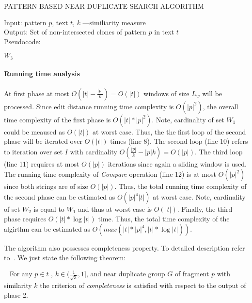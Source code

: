 \begin{algorithm}[!t]
\caption{PATTERN BASED NEAR DUPLICATE
SEARCH ALGORITHM}\cite{}
\label{alg:luciv}
Input: pattern $p$, text $t$, $k$ ---similiarity measure\\
Output: Set of non-intersected clones of pattern $p$ in text $t$\\
Pseudocode:
\begin{algorithmic}[1]
\ENDIF
\ENDFOR
{}

\ENDIF
\ENDFOR
\ENDFOR
{}
\ENDFOR


\ENDIF
\ENDFOR
\RETURN $W_3$

\end{algorithmic}
\end{algorithm}

\paragraph{Running time analysis}
At first phase at most $O(|t|-\frac{|p|}{k})=O(|t|)$ windows of size $L_{w}$ will be processed.
Since edit distance running time complexity is $O(|p|^2)$, the overall time complexity of the first phase is $O(|t| * |p|^2)$.
Note, cardinality of set $W_{1}$ could be meaused as $O(|t|)$ at worst case.
Thus, the the first loop of the second phase will be iterated over $O(|t|)$ times (line 8).
The second loop (line 10) refers to iteration over set $I$ with cardinality $O(\frac{|p|}{k}-|p|k) = O(|p|)$.
The third loop (line 11) requires at most $O(|p|)$ iterations since again a sliding window is used.
The running time complexity of \emph{Compare} operation (line 12) is at most $O(|p|^2)$ since both strings are of size $O(|p|)$.
Thus, the total running time complexity of the second phase can be estimated as $O(|p|^4|t|)$ at worst case.
Note, cardinality of set $W_{2}$ is equal to $W_{1}$ and thus at worst case is $O(|t|)$.
Finally, the third phase requires $O(|t| * \log |t|)$ time.
Thus, the total time complexity of the algirthm can be estimated as
$O(max(|t| * |p|^4, |t| * \log|t|))$.

The algorithm also possesses completeness property.
To detailed description refer to~\cite{luciv2019interactive}.
We just state the following theorem:
\begin{theorem}~\cite{luciv2019interactive}
For any $p \in t$ , $k \in (\frac{1}{ \sqrt{3}} , 1]$, and near duplicate group $G$ of fragment $p$ with similarity $k$ the criterion of \emph{completeness} is satisfied with respect to the output of phase 2.
\end{theorem}

